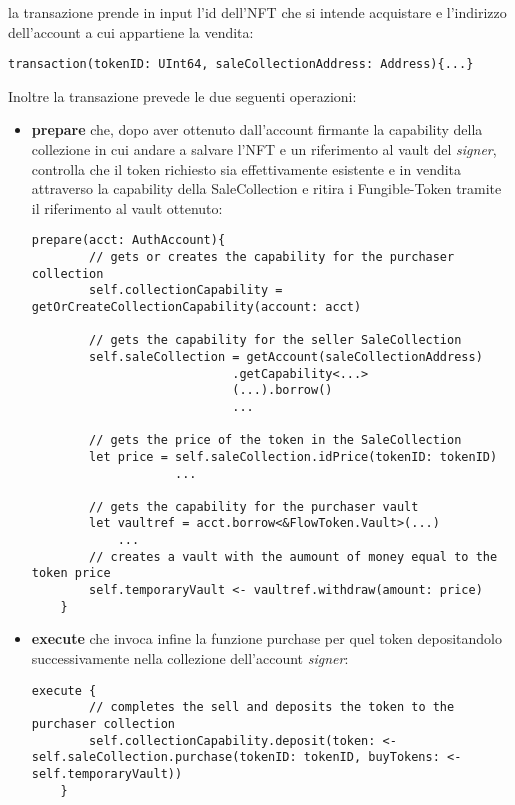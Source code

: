 \subsubsection*{}la transazione prende in input l'id dell'NFT che si intende acquistare e l'indirizzo dell'account a cui appartiene la vendita:
\begin{lstlisting}[style=all, style=cadence]
transaction(tokenID: UInt64, saleCollectionAddress: Address){...}
\end{lstlisting}
Inoltre la transazione prevede le due seguenti operazioni:
\begin{itemize}
    \item \textbf{prepare} che, dopo aver ottenuto dall'account firmante la capability della collezione in cui andare a salvare l'NFT e un riferimento al vault del \textit{signer}, controlla che il token richiesto sia effettivamente esistente e in vendita attraverso la capability della SaleCollection e ritira i Fungible-Token tramite il riferimento al vault ottenuto:
    \begin{lstlisting}[style=all, style=cadence]
prepare(acct: AuthAccount){
        // gets or creates the capability for the purchaser collection
        self.collectionCapability = getOrCreateCollectionCapability(account: acct)

        // gets the capability for the seller SaleCollection
        self.saleCollection = getAccount(saleCollectionAddress)
                            .getCapability<...>
                            (...).borrow()
                            ...

        // gets the price of the token in the SaleCollection
        let price = self.saleCollection.idPrice(tokenID: tokenID)
                    ...

        // gets the capability for the purchaser vault
        let vaultref = acct.borrow<&FlowToken.Vault>(...)
            ...
        // creates a vault with the aumount of money equal to the token price
        self.temporaryVault <- vaultref.withdraw(amount: price)
    }
\end{lstlisting}
    \item \textbf{execute} che invoca infine la funzione purchase per quel token depositandolo successivamente nella collezione dell'account \textit{signer}:
    \begin{lstlisting}[style=all, style=cadence]
execute {
        // completes the sell and deposits the token to the purchaser collection
        self.collectionCapability.deposit(token: <- self.saleCollection.purchase(tokenID: tokenID, buyTokens: <-self.temporaryVault))
    }
\end{lstlisting}
\end{itemize}

